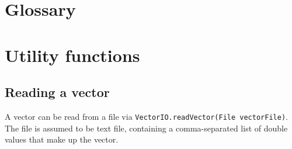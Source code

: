 \documentclass[11pt]{article} %
\newcommand{\code}{\texttt}
\begin{document}

\appendix
\section{Glossary}
\section{Utility functions}
\subsection{Reading a vector} \label{sec:read_vec}
A vector can be read from a file via \code{VectorIO.readVector(File vectorFile)}. The file is assumed to be text file, containing a comma-separated list of double values that make up the vector.
\end{document}
